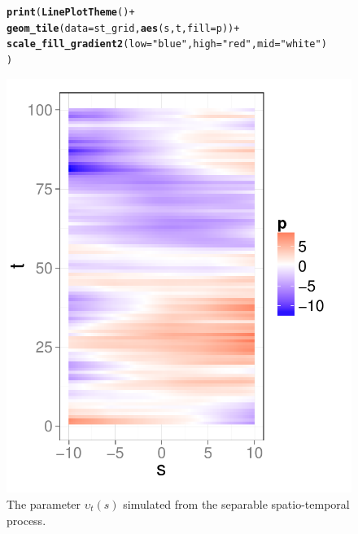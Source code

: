 \documentclass[a4paper,11pt]{article}\usepackage[]{graphicx}\usepackage[]{color}
\makeatletter
\def\maxwidth{ %
  \ifdim\Gin@nat@width>\linewidth
    \linewidth
  \else
    \Gin@nat@width
  \fi
}
\newcommand{\hlstr}[1]{\textcolor[rgb]{0.192,0.494,0.8}{#1}}%
\newcommand{\hlopt}[1]{\textcolor[rgb]{0,0,0}{#1}}%
\newcommand{\hlstd}[1]{\textcolor[rgb]{0.345,0.345,0.345}{#1}}%
\newcommand{\hlkwc}[1]{\textcolor[rgb]{0.333,0.667,0.333}{#1}}%
\newcommand{\hlkwd}[1]{\textcolor[rgb]{0.737,0.353,0.396}{\textbf{#1}}}%
\newenvironment{kframe}{%
 \def\at@end@of@kframe{}%
 \ifinner\ifhmode%
  \def\at@end@of@kframe{\end{minipage}}%
  \begin{minipage}{\columnwidth}%
 \fi\fi%
 \def\FrameCommand##1{\hskip\@totalleftmargin \hskip-\fboxsep
 \colorbox{shadecolor}{##1}\hskip-\fboxsep
     \hskip-\linewidth \hskip-\@totalleftmargin \hskip\columnwidth}%
 \MakeFramed {\advance\hsize-\width
   \@totalleftmargin\z@ \linewidth\hsize
   \@setminipage}}%
 {\par\unskip\endMakeFramed%
 \at@end@of@kframe}
\newenvironment{knitrout}{}{} %
\makeatother
\begin{document}
\begin{figure}
\begin{center}
\begin{knitrout}
\color{fgcolor}\begin{kframe}
\begin{alltt}
\hlkwd{print}\hlstd{(}\hlkwd{LinePlotTheme}\hlstd{()} \hlopt{+}
        \hlkwd{geom_tile}\hlstd{(}\hlkwc{data}\hlstd{=st_grid,}\hlkwd{aes}\hlstd{(s,t,}\hlkwc{fill}\hlstd{=p))} \hlopt{+}
        \hlkwd{scale_fill_gradient2}\hlstd{(}\hlkwc{low}\hlstd{=}\hlstr{"blue"}\hlstd{,}\hlkwc{high}\hlstd{=}\hlstr{"red"}\hlstd{,}\hlkwc{mid}\hlstd{=}\hlstr{"white"}\hlstd{)}
      \hlstd{)}
\end{alltt}
\end{kframe}
\includegraphics[width=\maxwidth]{figure/upsilon-plot2-1} 

\end{knitrout}
\end{center}
\caption{The parameter $\upsilon_t(s)$ simulated from the separable spatio-temporal process.}
\label{fig:upsilon}
\end{figure}
\end{document}
